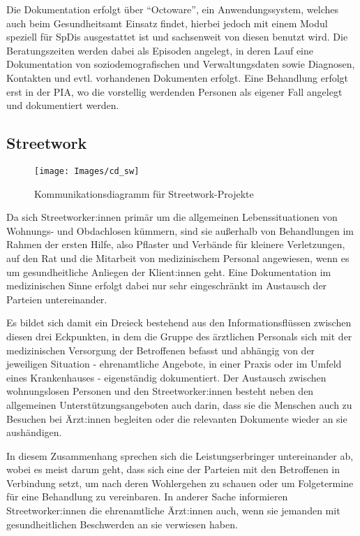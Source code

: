 Die Dokumentation erfolgt über \enquote{Octoware}, ein Anwendungssystem, welches auch beim Gesundheitsamt Einsatz findet, hierbei jedoch mit einem Modul speziell für \acp{SpDi} ausgestattet ist und sachsenweit von diesen benutzt wird. Die Beratungszeiten werden dabei als Episoden angelegt, in deren Lauf eine Dokumentation von soziodemografischen und Verwaltungsdaten sowie Diagnosen, Kontakten und evtl. vorhandenen Dokumenten erfolgt. Eine Behandlung erfolgt erst in der \ac{PIA}, wo die vorstellig werdenden Personen als eigener Fall angelegt und dokumentiert werden.

\subsection{Streetwork}\label{sub:sw}

\begin{figure}[h]
	\centering
	\texttt{[image: Images/cd\_sw]}
	\caption[Kommunikationsdiagramm Streetwork]{Kommunikationsdiagramm für Streetwork-Projekte}
	\label{fig:cdSW}
\end{figure}

Da sich Streetworker:innen primär um die allgemeinen Lebenssituationen von Wohnungs- und Obdachlosen kümmern, sind sie außerhalb von Behandlungen im Rahmen der ersten Hilfe, also Pflaster und Verbände für kleinere Verletzungen, auf den Rat und die Mitarbeit von medizinischem Personal angewiesen, wenn es um gesundheitliche Anliegen der Klient:innen geht. Eine Dokumentation im medizinischen Sinne erfolgt dabei nur sehr eingeschränkt im Austausch der Parteien untereinander.

Es bildet sich damit ein Dreieck bestehend aus den Informationsflüssen zwischen diesen drei Eckpunkten, in dem die Gruppe des ärztlichen Personals sich mit der medizinischen Versorgung der Betroffenen befasst und abhängig von der jeweiligen Situation - ehrenamtliche Angebote, in einer Praxis oder im Umfeld eines Krankenhauses - eigenständig dokumentiert. Der Austausch zwischen wohnungslosen Personen und den Streetworker:innen besteht neben den allgemeinen Unterstützungsangeboten auch darin, dass sie die Menschen auch zu Besuchen bei Ärzt:innen begleiten oder die relevanten Dokumente wieder an sie aushändigen.

In diesem Zusammenhang sprechen sich die Leistungserbringer untereinander ab, wobei es meist darum geht, dass sich eine der Parteien mit den Betroffenen in Verbindung setzt, um nach deren Wohlergehen zu schauen oder um Folgetermine für eine Behandlung zu vereinbaren. In anderer Sache informieren Streetworker:innen die ehrenamtliche Ärzt:innen auch, wenn sie jemanden mit gesundheitlichen Beschwerden an sie verwiesen haben.


